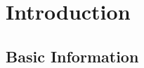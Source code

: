 \documentclass[11pt,
  english,
  a4paper,
]{article}
\begin{document}
\tagstructend

\pagebreak
\setlength{\parskip}{5mm plus1mm minus1mm}
\setcounter{page}{1}
\renewcommand{\thefigure}{\arabic{figure}}
\renewcommand{\thetable}{\arabic{table}}
\setcounter{table}{0}
\setcounter{figure}{0}

\setlength\parskip{0.5em plus 0.1em minus 0.2em}


\hypertarget{introduction}{%
\section{Introduction}\label{introduction}}

\leavevmode\tagmcend\tagstructend


\hypertarget{basic-information}{%
\subsection{Basic Information}\label{basic-information}}

\leavevmode\tagmcend\tagstructend

\end{document}
